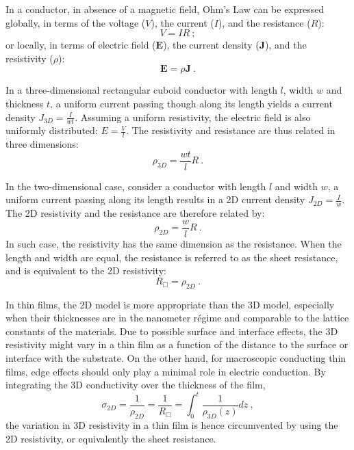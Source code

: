 In a conductor, in absence of a magnetic field, Ohm's Law can be expressed globally, in terms of the voltage ($V$), the current ($I$), and the resistance ($R$):%
\begin{equation}%
    V = I R~;%
\end{equation}%
or locally, in terms of electric field ($\mathbf{E}$), the current density ($\mathbf{J}$), and the resistivity ($\rho$):%
\begin{equation}%
    \mathbf{E} = \rho \mathbf{J}~.%
\end{equation}%

In a three-dimensional rectangular cuboid conductor with length $l$, width $w$ and thickness $t$, a uniform current passing though along its length yields a current density $J_{3D} = \frac{I}{wt}$. Assuming a uniform resistivity, the electric field is also uniformly distributed: $E = \frac{V}{l}$. The resistivity and resistance are thus related in three dimensions:%
\begin{equation}%
    \rho_{3D} = \frac{wt}{l}R~.%
\end{equation}%

In the two-dimensional case, consider a conductor with length $l$ and width $w$, a uniform current passing along its length results in a 2D current density $J_{2D} = \frac{I}{w}$. The 2D resistivity and the resistance are therefore related by:%
\begin{equation}\label{eq:2D_rho}%
	\rho_{2D} = \frac{w}{l}R~.%
\end{equation}%
In such case, the resistivity has the same dimension as the resistance. When the length and width are equal, the resistance is referred to as the sheet resistance, and is equivalent to the 2D resistivity:%
\begin{equation}%
	R_{\Box} = \rho_{2D}~.%
\end{equation}

In thin films, the 2D model is more appropriate than the 3D model, especially when their thicknesses are in the nanometer r\'egime and comparable to the lattice constants of the materials. Due to possible surface and interface effects, the 3D resistivity might vary in a thin film as a function of the distance to the surface or interface with the substrate. On the other hand, for macroscopic conducting thin films, edge effects should only play a minimal role in electric conduction. By integrating the 3D conductivity over the thickness of the film,%
\begin{equation}%
	\sigma_{2D} = \frac{1}{\rho_{2D}} = \frac{1}{R_\Box} = \int_0^t\frac{1}{\rho_{3D}(z)}dz~,%
\end{equation}%
the variation in 3D resistivity in a thin film is hence circumvented by using the 2D resistivity, or equivalently the sheet resistance.

